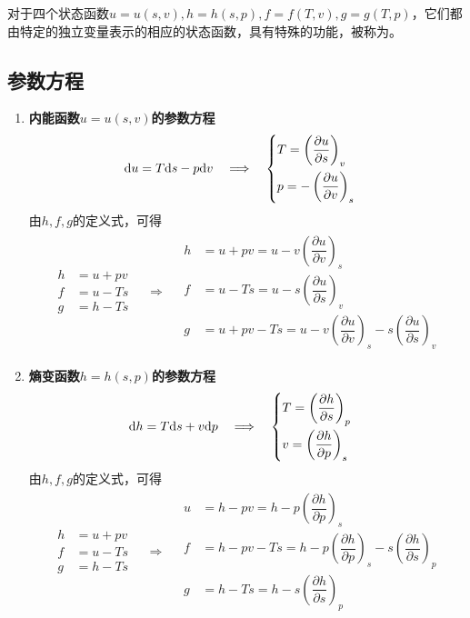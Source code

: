 对于四个状态函数$u=u(s,v), h =h(s, p), f = f(T, v), g = g(T, p)$，它们都由特定的独立变量表示的相应的状态函数，具有特殊的功能，被称为。

\subsection{参数方程}
\begin{enumerate}[1. ]
	\item  \textbf{内能函数$u = u(s, v)$的参数方程}
		\begin{align*}
			{\rm{d}} u  = T {\rm{d}} s - p {\rm{d}} v  \quad \Longrightarrow \quad 
			\begin{cases}
				T = \left(\dfrac{\partial u}{\partial s}\right)_v \\[1em]
				p  = -\left(\dfrac{\partial u}{\partial v}\right)_s
			\end{cases}
		\end{align*}
	由$h,f,g$的定义式，可得
	\begin{align*}
		\begin{aligned}
			h &= u +pv\\
			f &= u -Ts\\
			g &= h -Ts
		\end{aligned} 
	\quad \Longrightarrow \quad
	\begin{aligned}
		h &= u +pv= u - v\left(\dfrac{\partial u}{\partial v}\right)_s\\[0.5em]
		f &= u - Ts = u - s\left(\dfrac{\partial u}{\partial s}\right)_v\\[0.5em]
		g &= u + pv -Ts = u - v\left(\dfrac{\partial u}{\partial v}\right)_s - s\left(\dfrac{\partial u}{\partial s}\right)_v
	\end{aligned}
	\end{align*}

\item  \textbf{熵变函数$h = h(s, p)$的参数方程}
\begin{align*}
	{\rm{d}} h = T {\rm{d}} s + v {\rm{d}} p  \quad \Longrightarrow \quad 
	\begin{cases}
		T = \left(\dfrac{\partial h}{\partial s}\right)_p \\[1em]
		v = \left(\dfrac{\partial h}{\partial p}\right)_s
	\end{cases}
\end{align*}
由$h,f,g$的定义式，可得
\begin{align*}
	\begin{aligned}
		h &= u +pv\\
		f &= u -Ts\\
		g &= h -Ts
	\end{aligned} 
	\quad \Longrightarrow \quad
	\begin{aligned}
		u &= h - pv= h - p\left(\dfrac{\partial h}{\partial p}\right)_s\\[0.5em]
		f &= h - pv - Ts = h - p\left(\dfrac{\partial h}{\partial p}\right)_s - s\left(\dfrac{\partial h}{\partial s}\right)_p\\[0.5em]
		g &= h -Ts = h - s \left(\dfrac{\partial h}{\partial s}\right)_p
	\end{aligned}
\end{align*}


\end{enumerate}
